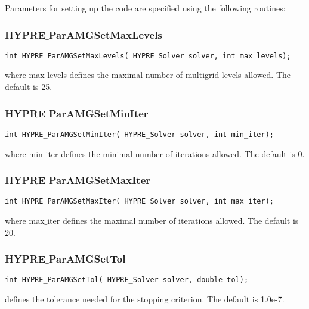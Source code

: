 Parameters for setting up the code are specified using the following routines:

\subsubsection*{HYPRE$\_$ParAMGSetMaxLevels}
\begin{display}
\begin{verbatim}
int HYPRE_ParAMGSetMaxLevels( HYPRE_Solver solver, int max_levels);
\end{verbatim}
\end{display}
where max$\_$levels defines the maximal number of multigrid levels allowed.
The default is 25.

\subsubsection*{HYPRE$\_$ParAMGSetMinIter}
\begin{display}
\begin{verbatim}
int HYPRE_ParAMGSetMinIter( HYPRE_Solver solver, int min_iter);
\end{verbatim}
\end{display}
where min$\_$iter defines the minimal number of iterations allowed.
The default is 0.

\subsubsection*{HYPRE$\_$ParAMGSetMaxIter}
\begin{display}
\begin{verbatim}
int HYPRE_ParAMGSetMaxIter( HYPRE_Solver solver, int max_iter);
\end{verbatim}
\end{display}
where max$\_$iter defines the maximal number of iterations allowed.
The default is 20.

\subsubsection*{HYPRE$\_$ParAMGSetTol}
\begin{display}
\begin{verbatim}
int HYPRE_ParAMGSetTol( HYPRE_Solver solver, double tol);
\end{verbatim}
\end{display}
defines the tolerance needed for the stopping criterion. The default is 1.0e-7.

